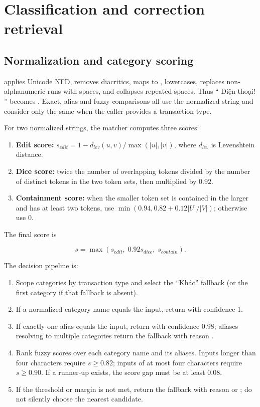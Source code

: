 \section{Classification and correction retrieval}
\label{app:classification-algorithms}

\subsection{Normalization and category scoring}

 applies Unicode NFD, removes diacritics, maps  to , lowercases, replaces non-alphanumeric runs with spaces, and collapses repeated spaces. Thus ``  Điện-thoại! '' becomes . Exact, alias and fuzzy comparisons all use the normalized string and consider only the same  when the caller provides a transaction type.

For two normalized strings, the matcher computes three scores:

\begin{enumerate}
  \item \textbf{Edit score:} $s_{edit}=1-d_{lev}(u,v)/\max(|u|,|v|)$, where $d_{lev}$ is Levenshtein distance.
  \item \textbf{Dice score:} twice the number of overlapping tokens divided by the number of distinct tokens in the two token sets, then multiplied by $0.92$.
  \item \textbf{Containment score:} when the smaller token set is contained in the larger and has at least two tokens, use $\min(0.94,0.82+0.12|U|/|V|)$; otherwise use 0.
\end{enumerate}

The final score is

\begin{equation}
  s=\max(s_{edit},\;0.92s_{dice},\;s_{contain}).
\end{equation}

The decision pipeline is:

\begin{enumerate}
  \item Scope categories by transaction type and select the ``Khác'' fallback (or the first category if that fallback is absent).
  \item If a normalized category name equals the input, return  with confidence 1.
  \item If exactly one alias equals the input, return  with confidence 0.98; aliases resolving to multiple categories return the fallback with reason .
  \item Rank fuzzy scores over each category name and its aliases. Inputs longer than four characters require $s\geq0.82$; inputs of at most four characters require $s\geq0.90$. If a runner-up exists, the score gap must be at least $0.08$.
  \item If the threshold or margin is not met, return the fallback with reason  or ; do not silently choose the nearest candidate.
\end{enumerate}


